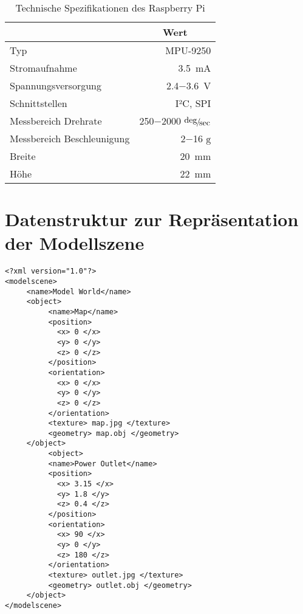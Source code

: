 \begin{table}[ht]
\caption{Technische Spezifikationen des Raspberry Pi}
\begin{center}
\begin{tabular}{|l|r|}
\hline
\rowcolor{lightgray} \multicolumn{1}{|c|}{\textbf{Spezifikation}} & \multicolumn{1}{|c|}{\textbf{Wert}}\\
\hline
Typ & MPU-9250 \\
\hline
Stromaufnahme & \SI{3,5}{\milli\ampere} \\
\hline
Spannungsversorgung & \SI{2,4}{}$-$\SI{3,6}{\volt} \\
\hline
Schnittstellen & I²C, SPI \\
\hline
Messbereich Drehrate & \SI{250}{}$-$\SI{2000}{} $\nicefrac{\deg}{\sec}$\\
\hline
Messbereich Beschleunigung &  \SI{2}{}$-$\SI{16}{} $\mathrm{g}$\\
\hline
Breite & \SI{20}{\milli\meter} \\
\hline
Höhe & \SI{22}{\milli\meter}\\
\hline
\end{tabular}
\end{center}
\label{tab:raspberry}
\end{table}

\clearpage{}

\section{Datenstruktur zur Repräsentation der Modellszene}
\label{app.datastructure}
\begin{lstlisting}[label=source.data,caption=Datenstruktur zur Repräsentation der Modellszene]
<?xml version="1.0"?>
<modelscene>
     <name>Model World</name>
     <object>
          <name>Map</name>
          <position>
          	<x> 0 </x>
          	<y> 0 </y>
          	<z> 0 </z>
          </position>
          <orientation>
          	<x> 0 </x>
          	<y> 0 </y>
          	<z> 0 </z>
          </orientation>
          <texture> map.jpg </texture>
          <geometry> map.obj </geometry>
     </object>
          <object>
          <name>Power Outlet</name>
          <position>
          	<x> 3.15 </x>
          	<y> 1.8 </y>
          	<z> 0.4 </z>
          </position>
          <orientation>
          	<x> 90 </x>
          	<y> 0 </y>
          	<z> 180 </z>
          </orientation>
          <texture> outlet.jpg </texture>
          <geometry> outlet.obj </geometry>
     </object>
</modelscene>
\end{lstlisting}

\clearpage{}

%

%
%
